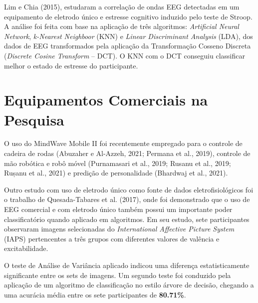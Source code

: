 Lim e Chia (2015), estudaram a correlação de ondas EEG detectadas em um equipamento de eletrodo único e 
estresse cognitivo induzido pelo teste de Stroop. A análise foi feita com base na aplicação de três algoritmos: 
\textit{Artificial Neural Network}, \textit{k-Nearest Neighboor} (KNN) e \textit{Linear Discriminant Analysis} (LDA), 
dos dados de EEG transformados pela aplicação da Transformação Cosseno Discreta (\textit{Discrete Cosine Transform} – DCT). 
O KNN com o DCT conseguiu classificar melhor o estado de estresse do participante.

\section{Equipamentos Comerciais na Pesquisa}

O uso do MindWave Mobile II foi recentemente empregado para o 
controle de cadeira de rodas (Abuzaher e Al-Azzeh, 2021; Permana et al., 2019), 
controle de mão robótica e robô móvel (Purnamasari et al., 2019; Rusanu et al., 2019; Rușanu et al., 2021) 
e predição de personalidade (Bhardwaj et al., 2021). 

Outro estudo com uso de eletrodo único como fonte de dados eletrofisiológicos foi o trabalho de Quesada-Tabares et al. (2017), 
onde foi demonstrado que o uso de EEG comercial e com eletrodo único também possui um importante poder classificatório 
quando aplicado em algoritmos. Em seu estudo, sete participantes observaram imagens selecionadas do 
\textit{International Affective Picture System} (IAPS) pertencentes a três grupos com diferentes valores de 
valência e excitabilidade. 

O teste de Análise de Variância aplicado indicou 
uma diferença estatisticamente significante entre os sets de imagens.
 Um segundo teste foi conduzido pela aplicação de um algoritmo de classificação no estilo árvore de decisão,
  chegando a uma acurácia média entre os sete participantes de \textbf{80.71\%}.
  

